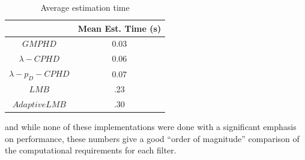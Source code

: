\documentclass{article}
\begin{document}
\begin{table}[H]
  \centering
  \begin{tabular}{ c| c }
    & Mean Est. Time (s) \\
      \hline
      $GMPHD$ & 0.03 \\
    $\lambda-CPHD$ & 0.06 \\
    $\lambda-p_D-CPHD$ & 0.07 \\
    $LMB$ & .23 \\
    $Adaptive LMB$ & .30 \\
  \end{tabular}
  \caption{Average estimation time}
  \label{tab:exec_time}
\end{table}
and while none of these implementations were done with a significant emphasis on performance, these numbers give a good ``order of magnitude'' comparison of the computational requirements for each filter.


\clearpage
\pagebreak
\printbibliography
\end{document}
